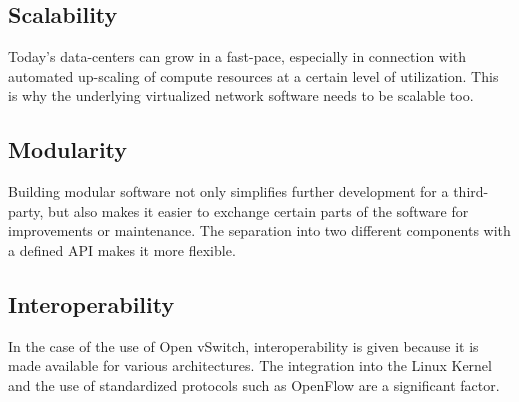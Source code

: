 \subsection{Scalability}

Today's data-centers can grow in a fast-pace, especially in connection with automated up-scaling of compute resources at a certain level of utilization. This is why the underlying virtualized network software needs to be scalable too.

\subsection{Modularity}

Building modular software not only simplifies further development for a third-party, but also makes it easier to exchange certain parts of the software for improvements or maintenance. The separation into two different components with a defined API makes it more flexible.

\subsection{Interoperability}

In the case of the use of Open vSwitch, interoperability is given because it is made available for various architectures. The integration into the Linux Kernel and the use of standardized protocols such as OpenFlow are a significant factor.